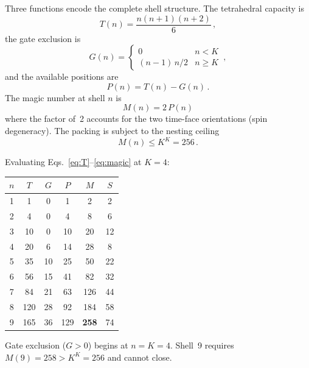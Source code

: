 \documentclass[twocolumn]{iopjournal}
\begin{document}
Three functions encode the complete shell structure.
The tetrahedral capacity is
\begin{equation}
  T(n) = \frac{n(n{+}1)(n{+}2)}{6}\,,
  \label{eq:T}
\end{equation}
the gate exclusion is
\begin{equation}
  G(n) = \begin{cases}
           0 & n < K \\[2pt]
           (n{-}1)\,n/2 & n \geq K
         \end{cases}\,,
  \label{eq:G}
\end{equation}
and the available positions are
\begin{equation}
  P(n) = T(n) - G(n)\,.
  \label{eq:P}
\end{equation}
The magic number at shell $n$ is
\begin{equation}
  \boxed{\; M(n) = 2\,P(n) \;}
  \label{eq:magic}
\end{equation}
where the factor of~2 accounts for the two time-face orientations
(spin degeneracy). The packing is subject to the nesting ceiling
\begin{equation}
  M(n) \leq K^K = 256\,.
  \label{eq:ceiling}
\end{equation}

Evaluating Eqs.~\eqref{eq:T}--\eqref{eq:magic} at $K = 4$:

\begin{center}
\footnotesize
\begin{tabular}{cccccc}
\toprule
$n$ & $T$ & $G$ & $P$ & $M$ & $S$ \\
\midrule
1 &   1 &  0 &   1 &    2 &  2 \\
2 &   4 &  0 &   4 &    8 &  6 \\
3 &  10 &  0 &  10 &   20 & 12 \\
4 &  20 &  6 &  14 &   28 &  8 \\
5 &  35 & 10 &  25 &   50 & 22 \\
6 &  56 & 15 &  41 &   82 & 32 \\
7 &  84 & 21 &  63 &  126 & 44 \\
8 & 120 & 28 &  92 &  184 & 58 \\
9 & 165 & 36 & 129 & \textbf{258} & 74 \\
\bottomrule
\end{tabular}
\end{center}
Gate exclusion ($G > 0$) begins at $n = K = 4$.
Shell~9 requires $M(9) = 258 > K^K = 256$ and cannot close.
\end{document}
